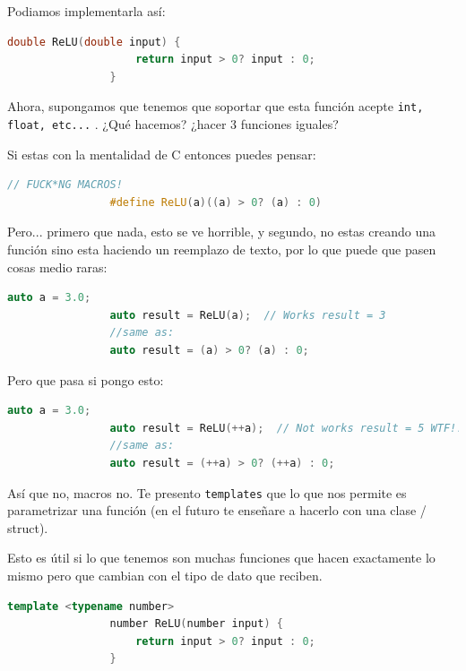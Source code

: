 \documentclass[12pt, fleqn]{report}                             %
\theoremstyle{break}                                            %
\newcommand{\textCode}[1]  { \texttt{#1} }                      %
\begin{document}
            Podiamos implementarla así:
            \begin{lstlisting}[language=C++, gobble=16]
                double ReLU(double input) {
                    return input > 0? input : 0;
                }
            \end{lstlisting}

            Ahora, supongamos que tenemos que soportar que esta función acepte
            \textCode{int, float, etc...}. ¿Qué hacemos? ¿hacer 3 funciones iguales?

            Si estas con la mentalidad de C entonces puedes pensar:
            \begin{lstlisting}[language=C++, gobble=16]
                // FUCK*NG MACROS!
                #define ReLU(a)((a) > 0? (a) : 0)
            \end{lstlisting}

            Pero... primero que nada, esto se ve horrible, y segundo, no estas creando una función 
            sino esta haciendo un reemplazo de texto, por lo que puede que pasen cosas medio raras:
            \begin{lstlisting}[language=C++, gobble=16]
                auto a = 3.0;
                auto result = ReLU(a);  // Works result = 3
                //same as:
                auto result = (a) > 0? (a) : 0;  
            \end{lstlisting}

            Pero que pasa si pongo esto:
            \begin{lstlisting}[language=C++, gobble=16]
                auto a = 3.0;
                auto result = ReLU(++a);  // Not works result = 5 WTF!!!!
                //same as:
                auto result = (++a) > 0? (++a) : 0;  
            \end{lstlisting}

            Así que no, macros no.
            Te presento \textCode{templates} que lo que nos permite es parametrizar una función (en el futuro
            te enseñare a hacerlo con una clase / struct).

            Esto es útil si lo que tenemos son muchas funciones que hacen exactamente lo mismo pero 
            que cambian con el tipo de dato que reciben.
            \begin{lstlisting}[language=C++, gobble=16]
                template <typename number>
                number ReLU(number input) {
                    return input > 0? input : 0;
                }
            \end{lstlisting}
\end{document}
